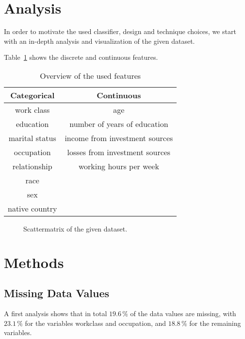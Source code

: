 \documentclass{article}
\begin{document}
\section{Analysis}
\label{sec:analysis}

In order to motivate the used classifier, design and technique
choices, we start with an in-depth analysis and visualization of the
given dataset.

Table~\ref{tab:features} shows the discrete and continuous
features. 

\begin{table}[h]
  \centering
  \begin{tabular}{cc}
    \toprule
  Categorical  & Continuous                     \\
    \midrule
    work class & age                            \\
    education  & number of years of education   \\
marital status & income from investment sources \\
occupation     & losses from investment sources \\
relationship   & working hours per week         \\
race           &                                \\
sex            &                                \\
native country &                                \\
      \bottomrule
  \end{tabular}
  \caption{Overview of the used features}
  \label{tab:features}
\end{table}

\begin{figure}[H]
  \centering
  
  \caption{Scattermatrix of the given dataset.}
  \label{fig:scatter}
\end{figure}

\section{Methods}
\label{sec:methods}

\subsection{Missing Data Values}

A first analysis shows that in total $19.6\,\%$ of the data values are
missing, with $23.1\,\%$ for the variables workclass and occupation,
and $18.8\,\%$ for the remaining variables. 
\end{document}
